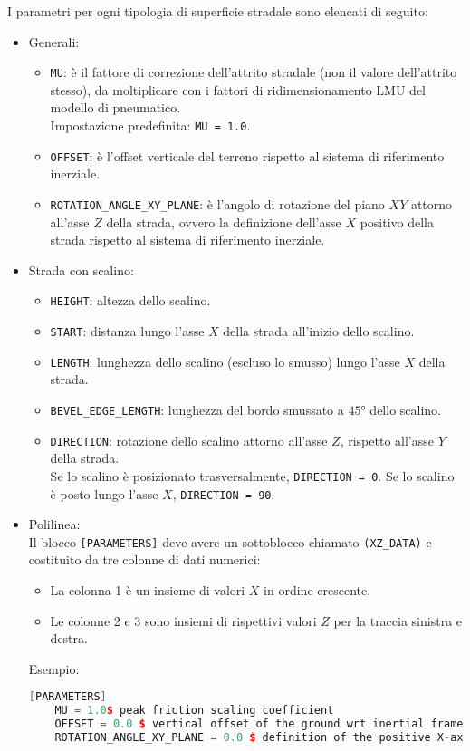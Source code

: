 I parametri per ogni tipologia di superficie stradale sono elencati di seguito:
\begin{itemize}
	\item Generali:
	\begin{itemize}
		\item \texttt{MU}: è il fattore di correzione dell'attrito stradale (non il valore dell'attrito stesso), da moltiplicare con i fattori di ridimensionamento LMU del modello di pneumatico.\\
		Impostazione predefinita: \texttt{MU = 1.0}.
		\item \texttt{OFFSET}: è l'offset verticale del terreno rispetto al sistema di riferimento inerziale.
		\item \texttt{ROTATION\_ANGLE\_XY\_PLANE}: è l'angolo di rotazione del piano $XY$ attorno all'asse $Z$ della strada, ovvero la definizione dell'asse $X$ positivo della strada rispetto al sistema di riferimento inerziale.
	\end{itemize}
	\item Strada con scalino:
	\begin{itemize}
		\item \texttt{HEIGHT}: altezza dello scalino.
		\item \texttt{START}: distanza lungo l'asse $X$ della strada all'inizio dello scalino.
		\item \texttt{LENGTH}: lunghezza dello scalino (escluso lo smusso) lungo l'asse $X$ della strada.
		\item \texttt{BEVEL\_EDGE\_LENGTH}: lunghezza del bordo smussato a $45°$ dello scalino.
		\item \texttt{DIRECTION}: rotazione dello scalino attorno all'asse $Z$, rispetto all'asse $Y$ della strada.\\
		Se lo scalino è posizionato trasversalmente, \texttt{DIRECTION = 0}. Se lo scalino è posto lungo l'asse $X$, \texttt{DIRECTION = 90}.
	\end{itemize}
	\item Polilinea:\\
	Il blocco \texttt{[PARAMETERS]} deve avere un sottoblocco chiamato \texttt{(XZ\_DATA)} e costituito da tre colonne di dati numerici:
	\begin{itemize}
		\item La colonna 1 è un insieme di valori $X$ in ordine crescente.
		\item Le colonne 2 e 3 sono insiemi di rispettivi valori $Z$ per la traccia sinistra e destra.
	\end{itemize}
	Esempio:
	\begin{lstlisting}[language = C++, basicstyle=\ttfamily\small, basewidth=0.55em]
	[PARAMETERS]
	MU = 1.0$ peak friction scaling coefficient
	OFFSET = 0.0 $ vertical offset of the ground wrt inertial frame
	ROTATION_ANGLE_XY_PLANE = 0.0 $ definition of the positive X-axis of the road wrt inertial frame
	

\end{lstlisting}
\end{itemize}
